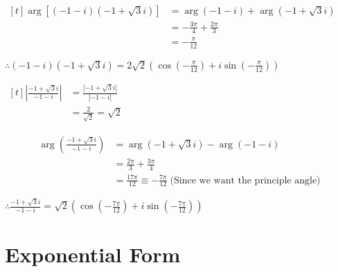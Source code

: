 \documentclass[11pt,a4paper]{book}
\begin{document}
\begin{example}
\begin{tasks}[label=(\alph*),after-item-skip=.8cm]
$
\begin{aligned}[t]
\arg\left[\left(-1-i\right)\left(-1+\sqrt{3}i\right)\right] & =\arg\left(-1-i\right)+\arg\left(-1+\sqrt{3}i\right)\\
 & =-\frac{3\pi}{4}+\frac{2\pi}{3}\\
 & =-\frac{\pi}{12}
\end{aligned}
$

${\displaystyle \therefore\left(-1-i\right)\left(-1+\sqrt{3}i\right)=2\sqrt{2}\left(\cos\left(-\frac{\pi}{12}\right)+i\sin\left(-\frac{\pi}{12}\right)\right)}$

\task
$
\begin{aligned}[t]
\left|\frac{-1+\sqrt{3}i}{-1-i}\right| & =\frac{\left|-1+\sqrt{3}i\right|}{\left|-1-i\right|}\\
 & =\frac{2}{\sqrt{2}}=\sqrt{2}
\end{aligned}
$

\begin{align*}
\arg\left(\frac{-1+\sqrt{3}i}{-1-i}\right) & =\arg\left(-1+\sqrt{3}i\right)-\arg\left(-1-i\right)\\
 & =\frac{2\pi}{3}+\frac{3\pi}{4}\\
 & =\frac{17\pi}{12}\equiv-\frac{7\pi}{12}\;\text{(Since we want the principle angle)}
\end{align*}

${\displaystyle \therefore\frac{-1+\sqrt{3}i}{-1-i}=\sqrt{2}\left(\cos\left(-\frac{7\pi}{12}\right)+i\sin\left(-\frac{7\pi}{12}\right)\right)}$

\end{tasks}
\end{example}

\newpage

\section{Exponential Form}
\end{document}
